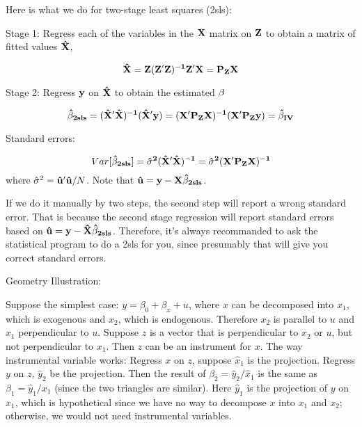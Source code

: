 Here is what we do for two-stage least squares (2sls): 

Stage 1:  Regress each of the variables in the $\bf X$ matrix on
$\bf Z$ to obtain a matrix of fitted values $\bf \hat X$,

\begin{equation}
\bf \hat X=Z(Z'Z)^{-1}Z'X=P_ZX
\end{equation}

Stage 2:  Regress $\bf y$ on $\bf \hat X$ to obtain the estimated
$\bf \beta$

\begin{equation}
\bf  \hat \beta_{2sls}=(\hat X' \hat X)^{-1}(\hat X'
y)=(X'P_ZX)^{-1}(X'P_Zy)=\hat \beta_{IV}
\end{equation}

Standard errors:

\begin{equation}
Var \bf [ \hat \beta_{2sls}]= \hat \sigma^2 (\hat X' \hat X)^{-1}= \hat
\sigma^2 (X'P_ZX)^{-1}
\end{equation}
where $ \hat \sigma^2 ={\bf \hat u' \hat u} / N$.  Note that $\bf \hat
u = y- X \hat \beta_{2sls}$.

If we do it manually by two steps, the second step will report a wrong
standard error.  That is because the second stage regression will
report standard errors based on $\bf \hat u = y- \hat X \hat
\beta_{2sls}$.  Therefore, it's always recommanded to ask the
statistical program to do a 2sls for you, since presumably that will
give you correct standard errors.

Geometry Illustration:

Suppose the simplest case:  $y=\beta_0 + \beta_ x + u $, where $x$
can be decomposed into $x_1$, which is exogenous and $x_2$, which
is endogenous. Therefore $x_2$ is parallel to $u$ and $x_1$
perpendicular to $u$.  Suppose $z$ is a vector that is
perpendicular to $x_2$ or $u$, but not perpendicular to $x_1$.
Then $z$ can be an instrument for $x$.  The way instrumental
variable works: Regress $x$ on $z$, suppose $\hat x_1$ is the
projection.  Regress $y$ on $z$, $\hat y_2$ be the projection.
Then the result of $\beta_2 =  \hat y_2 / \hat x_1$ is the same as
$\beta_1= \hat y_1 / x_1$ (since the two triangles are similar).
Here $\hat y_1$ is the projection of $y$ on $x_1$, which is
hypothetical since we have no way to decompose $x$ into $x_1$ and
$x_2$; otherwise, we would not need instrumental variables.




